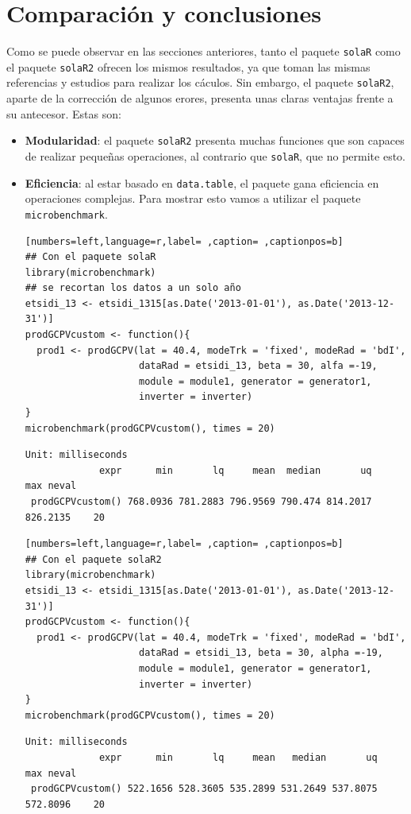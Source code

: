 \section{Comparación y conclusiones}
\label{sec:org4b6368f}
\label{sec:comparacion-conclusiones}
Como se puede observar en las secciones anteriores, tanto el paquete \texttt{solaR} como el paquete \texttt{solaR2} ofrecen los mismos resultados, ya que toman las mismas referencias y estudios para realizar los cáculos. Sin embargo, el paquete \texttt{solaR2}, aparte de la corrección de algunos erores, presenta unas claras ventajas frente a su antecesor. Estas son:
\begin{itemize}
\item \textbf{Modularidad}: el paquete \texttt{solaR2} presenta muchas funciones que son capaces de realizar pequeñas operaciones, al contrario que \texttt{solaR}, que no permite esto.
\item \textbf{Eficiencia}: al estar basado en \texttt{data.table}, el paquete gana eficiencia en operaciones complejas. Para mostrar esto vamos a utilizar el paquete \texttt{microbenchmark}.
\begin{lstlisting}[numbers=left,language=r,label= ,caption= ,captionpos=b]
## Con el paquete solaR
library(microbenchmark)
## se recortan los datos a un solo año
etsidi_13 <- etsidi_1315[as.Date('2013-01-01'), as.Date('2013-12-31')]
prodGCPVcustom <- function(){  
  prod1 <- prodGCPV(lat = 40.4, modeTrk = 'fixed', modeRad = 'bdI',
                    dataRad = etsidi_13, beta = 30, alfa =-19,
                    module = module1, generator = generator1,
                    inverter = inverter)
}
microbenchmark(prodGCPVcustom(), times = 20)
\end{lstlisting}

\begin{verbatim}
Unit: milliseconds
             expr      min       lq     mean  median       uq      max neval
 prodGCPVcustom() 768.0936 781.2883 796.9569 790.474 814.2017 826.2135    20
\end{verbatim}


\begin{lstlisting}[numbers=left,language=r,label= ,caption= ,captionpos=b]
## Con el paquete solaR2
library(microbenchmark)
etsidi_13 <- etsidi_1315[as.Date('2013-01-01'), as.Date('2013-12-31')]
prodGCPVcustom <- function(){  
  prod1 <- prodGCPV(lat = 40.4, modeTrk = 'fixed', modeRad = 'bdI',
                    dataRad = etsidi_13, beta = 30, alpha =-19,
                    module = module1, generator = generator1,
                    inverter = inverter)
}
microbenchmark(prodGCPVcustom(), times = 20)
\end{lstlisting}

\begin{verbatim}
Unit: milliseconds
             expr      min       lq     mean   median       uq      max neval
 prodGCPVcustom() 522.1656 528.3605 535.2899 531.2649 537.8075 572.8096    20
\end{verbatim}
\end{itemize}

